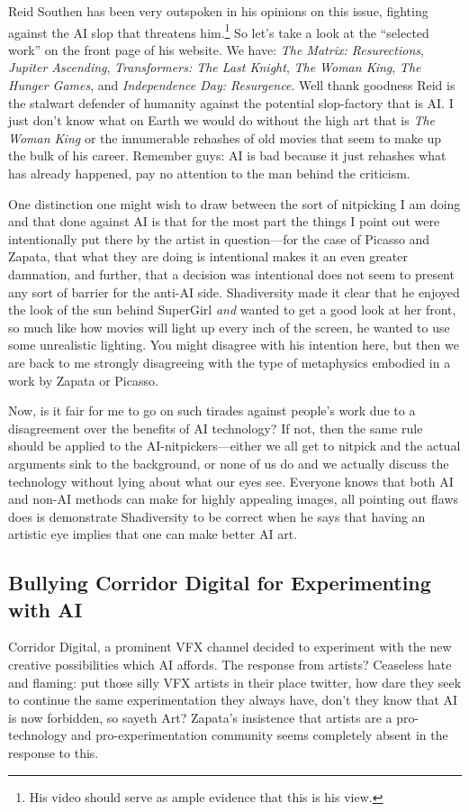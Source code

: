 \documentclass[11pt]{article}
\begin{document}
Reid Southen has been very outspoken in his opinions on this issue, fighting against the AI slop that threatens him.\footnote{His video should serve as ample evidence that this is his view.} So let's take a look at the ``selected work'' on the front page of his website. We have: \emph{The Matrix: Resurections}, \emph{Jupiter Ascending}, \emph{Transformers: The Last Knight}, \emph{The Woman King}, \emph{The Hunger Games}, and \emph{Independence Day: Resurgence}. Well thank goodness Reid is the stalwart defender of humanity against the potential slop-factory that is AI. I just don't know what on Earth we would do without the high art that is \emph{The Woman King} or the innumerable rehashes of old movies that seem to make up the bulk of his career. Remember guys: AI is bad because it just rehashes what has already happened, pay no attention to the man behind the criticism.

One distinction one might wish to draw between the sort of nitpicking I am doing and that done against AI is that for the most part the things I point out were intentionally put there by the artist in question---for the case of Picasso and Zapata, that what they are doing is intentional makes it an even greater damnation, and further, that a decision was intentional does not seem to present any sort of barrier for the anti-AI side. Shadiversity made it clear that he enjoyed the look of the sun behind SuperGirl \emph{and} wanted to get a good look at her front, so much like how movies will light up every inch of the screen, he wanted to use some unrealistic lighting. You might disagree with his intention here, but then we are back to me strongly disagreeing with the type of metaphysics embodied in a work by Zapata or Picasso.

Now, is it fair for me to go on such tirades against people's work due to a disagreement over the benefits of AI technology? If not, then the same rule should be applied to the AI-nitpickers---either we all get to nitpick and the actual arguments sink to the background, or none of us do and we actually discuss the technology without lying about what our eyes see. Everyone knows that both AI and non-AI methods can make for highly appealing images, all pointing out flaws does is demonstrate Shadiversity to be correct when he says that having an artistic eye implies that one can make better AI art.

\subsection*{Bullying Corridor Digital for Experimenting with AI}
\label{sec:org3e8c287}
Corridor Digital, a prominent VFX channel decided to experiment with the new creative possibilities which AI affords. The response from artists? Ceaseless hate and flaming: put those silly VFX artists in their place twitter, how dare they seek to continue the same experimentation they always have, don't they know that AI is now forbidden, so sayeth Art? Zapata's insistence that artists are a pro-technology and pro-experimentation community seems completely absent in the response to this.
\end{document}
